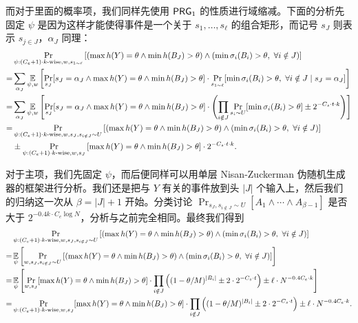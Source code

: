 而对于里面的概率项，我们同样先使用 $\mathsf{PRG}_1$ 的性质进行域缩减。下面的分析先固定 $\psi$ 是因为这样才能使得事件是一个关于 $s_1, \ldots, s_\ell$ 的组合矩形，而记号 $s_J$ 则表示 $s_{j \in J}$，$\alpha_J$ 同理：
\begin{align*}
      & \Pr_{\psi : (C_e + 1) \cdot k\text{-wise}, w, s_{1 \sim \ell}} \left[ (\max h(Y) = \theta \wedge \min h(B_J) > \theta) \wedge (\min \sigma_i(B_i) > \theta,\ \forall i \notin J)  \right] \\
    = & \sum_{\alpha_J} \operatorname*{\mathbb{E}}_{\psi, w} \left[ \Pr_{s_J} [ s_J = \alpha_J \wedge \max h(Y) = \theta \wedge \min h(B_J) > \theta ] \cdot \Pr_{s_{1 \sim \ell}} [\min \sigma_i(B_i) > \theta,\ \forall i \notin J \mid s_J = \alpha_J]  \right] \\
    = & \sum_{\alpha_J} \operatorname*{\mathbb{E}}_{\psi, w} \left[ \Pr_{s_J} [ s_J = \alpha_J \wedge \max h(Y) = \theta \wedge \min h(B_J) > \theta ] \cdot \left( \prod_{i \notin J} \Pr_{s_i \sim U}[\min \sigma_i(B_i) > \theta] \pm 2^{-C_s \cdot t \cdot k} \right) \right] \\
    = & \Pr_{\psi : (C_e + 1) \cdot k\text{-wise}, w, s_J, s_{i \notin J} \sim U}\left[ (\max h(Y) = \theta \wedge \min h(B_J) > \theta) \wedge (\min \sigma_i(B_i) > \theta,\ \forall i \notin J)  \right] \\
      & \pm \Pr_{\psi : (C_e + 1) \cdot k\text{-wise}, w, s_J}\left[ \max h(Y) = \theta \wedge \min h(B_J) > \theta  \right] \cdot 2^{-C_s \cdot t \cdot k}.
\end{align*}

对于主项，我们先固定 $\psi$，而后便同样可以用单层 Nisan-Zuckerman 伪随机生成器的框架进行分析。我们还是把与 $Y$ 有关的事件放到头 $|J|$ 个输入上，然后我们的归纳这一次从 $\beta = |J| + 1$ 开始。分类讨论 $\Pr_{s_J, s_{i \notin J} \sim U}[A_1 \wedge \cdots \wedge A_{\beta - 1}]$ 是否大于 $2^{-0.4 k \cdot C_e \log N}$，分析与之前完全相同。最终我们得到
\begin{align*}
      & \Pr_{\psi : (C_e + 1) \cdot k\text{-wise}, w, s_J, s_{i \notin J} \sim U}\left[ (\max h(Y) = \theta \wedge \min h(B_J) > \theta) \wedge (\min \sigma_i(B_i) > \theta,\ \forall i \notin J)  \right] \\
    = & \operatorname*{\mathbb{E}}_{\psi}\left[ \Pr_{w, s_J, s_{i \notin J} \sim U}\left[ (\max h(Y) = \theta \wedge \min h(B_J) > \theta) \wedge (\min \sigma_i(B_i) > \theta,\ \forall i \notin J) \right] \right] \\
    = & \operatorname*{\mathbb{E}}_{\psi}\left[ \Pr_{w, s_J}[ \max h(Y) = \theta \wedge \min h(B_J) > \theta ] \cdot \prod_{i \notin J} \left( (1 - \theta / M)^{|B_i|} \pm 2 \cdot 2^{-C_s \cdot t} \right) \pm \ell \cdot N^{-0.4 C_e \cdot k} \right] \\
    = & \Pr_{\psi : (C_e + 1) \cdot k\text{-wise}, w, s_J}[ \max h(Y) = \theta \wedge \min h(B_J) > \theta ] \cdot \prod_{i \notin J} \left( (1 - \theta / M)^{|B_i|} \pm 2 \cdot 2^{-C_s \cdot t} \right) \pm \ell \cdot N^{-0.4 C_e \cdot k}.
\end{align*}

